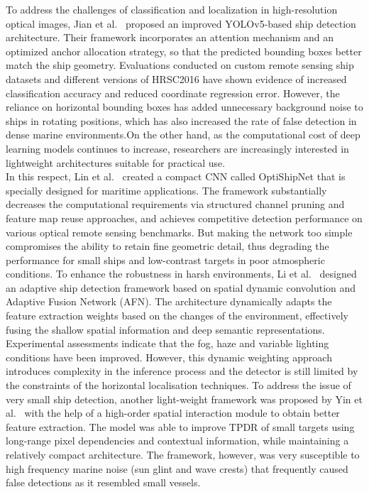 To address the challenges of classification and localization in high-resolution optical images, Jian et al.~\cite{rs15174319} proposed an improved YOLOv5-based ship detection architecture. Their framework incorporates an attention mechanism and an optimized anchor allocation strategy, so that the predicted bounding boxes better match the ship geometry. Evaluations conducted on custom remote sensing ship datasets and different versions of HRSC2016 have shown evidence of increased classification accuracy and reduced coordinate regression error. However, the reliance on horizontal bounding boxes has added unnecessary background noise to ships in rotating positions, which has also increased the rate of false detection in dense marine environments.On the other hand, as the computational cost of deep learning models continues to increase, researchers are increasingly interested in lightweight architectures suitable for practical use.\\


In this respect, Lin et al.~\cite{jmse12101786} created a compact CNN called OptiShipNet that is specially designed for maritime applications. The framework substantially decreases the computational requirements via structured channel pruning and feature map reuse approaches, and achieves competitive detection performance on various optical remote sensing benchmarks. But making the network too simple compromises the ability to retain fine geometric detail, thus degrading the performance for small ships and low-contrast targets in poor atmospheric conditions. 
To enhance the robustness in harsh environments, Li et al.~\cite{s24030859} designed an adaptive ship detection framework based on spatial dynamic convolution and Adaptive Fusion Network (AFN). The architecture dynamically adapts the feature extraction weights based on the changes of the environment, effectively fusing the shallow spatial information and deep semantic representations. Experimental assessments indicate that the fog, haze and variable lighting conditions have been improved. However, this dynamic weighting approach introduces complexity in the inference process and the detector is still limited by the constraints of the horizontal localisation techniques.
To address the issue of very small ship detection, another light-weight framework was proposed by Yin et al.~\cite{10379602} with the help of a high-order spatial interaction module to obtain better feature extraction. The model was able to improve TPDR of small targets using long-range pixel dependencies and contextual information, while maintaining a relatively compact architecture. The framework, however, was very susceptible to high frequency marine noise (sun glint and wave crests) that frequently caused false detections as it resembled small vessels. \\


